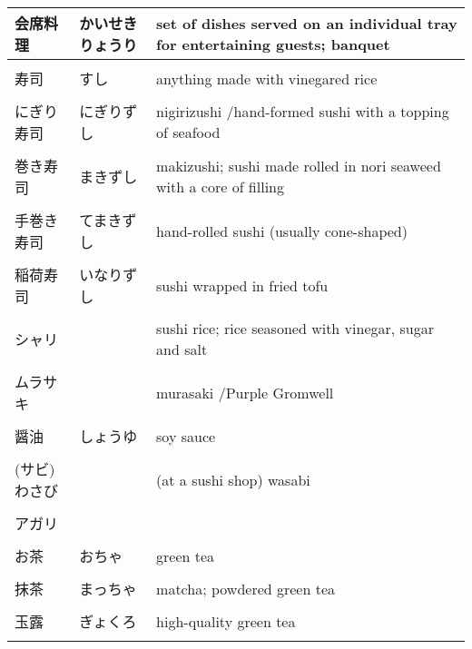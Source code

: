 \documentclass{article}
\begin{document}
\begin{tabular}{ l | l | p{11.5cm} }
会席料理        & かいせきりょうり              &set of dishes served on an individual tray for entertaining guests; banquet \\ \hline \\[-1em]
寿司            &すし                           &anything made with vinegared rice \\ \hline \\[-1em]
にぎり寿司      &にぎりずし                     &nigirizushi /hand-formed sushi with a topping of seafood \\ \hline \\[-1em]
巻き寿司        &まきずし                       &makizushi; sushi made rolled in nori seaweed with a core of filling \\ \hline \\[-1em]
手巻き寿司      &てまきずし                     &hand-rolled sushi (usually cone-shaped) \\ \hline \\[-1em]
稲荷寿司        &いなりずし                     &sushi wrapped in fried tofu \\ \hline \\[-1em]	
シャリ          &                               &sushi rice; rice seasoned with vinegar, sugar and salt \\ \hline \\[-1em]
ムラサキ        &                               &murasaki /Purple Gromwell \\ \hline \\[-1em]
醤油            &しょうゆ                       &soy sauce \\ \hline \\[-1em]
(サビ)わさび    &                               &(at a sushi shop) wasabi \\ \hline \\[-1em]
アガリ          &                               & \\ \hline \\[-1em]
お茶            &おちゃ                         &green tea \\ \hline \\[-1em]																		%
抹茶            &まっちゃ                       &matcha; powdered green tea   \\ \hline \\[-1em]														%
玉露            &ぎょくろ                       &high-quality green tea  \\ \hline \\[-1em]															%

\end{tabular}
\end{document}

